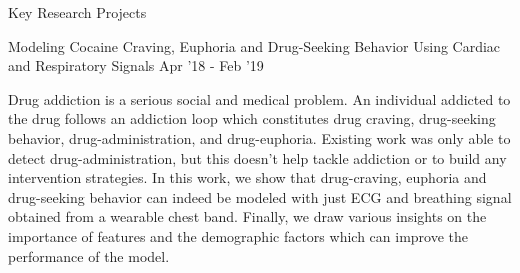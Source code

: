 \documentclass{resume} %
\begin{document}
\vspace*{-1.5mm}
\begin{rSection}{Key Research Projects}

\begin{rSubsection}{ Modeling Cocaine Craving, Euphoria and Drug-Seeking Behavior Using Cardiac and Respiratory Signals }{Apr '18 - Feb '19}{}{}
\item Drug addiction is a serious social and medical problem. An individual addicted to the drug follows an addiction loop which constitutes drug craving, drug-seeking behavior, drug-administration, and drug-euphoria. Existing work was only able to detect drug-administration, but this doesn't help tackle addiction or to build any intervention strategies. In this work, we show that drug-craving, euphoria and drug-seeking behavior can indeed be modeled with just ECG and breathing signal obtained from a wearable chest band. Finally, we draw various insights on the importance of features and the demographic factors which can improve the performance of the model.
\end{rSubsection}
\vspace*{-3mm}



\end{rSection}
\end{document}
